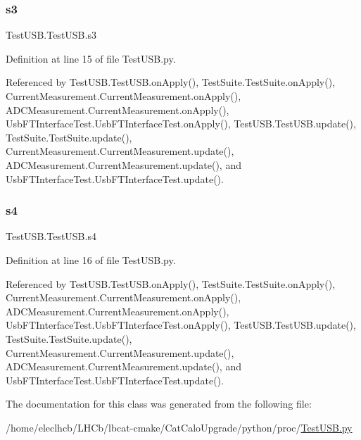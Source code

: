 \mbox{\label{classTestUSB_1_1TestUSB_a2983f5d10e563e44de3beac6fc9cb165}} 
\subsubsection{\texorpdfstring{s3}{s3}}
{\footnotesize\ttfamily Test\+U\+S\+B.\+Test\+U\+S\+B.\+s3}



Definition at line 15 of file Test\+U\+S\+B.\+py.



Referenced by Test\+U\+S\+B.\+Test\+U\+S\+B.\+on\+Apply(), Test\+Suite.\+Test\+Suite.\+on\+Apply(), Current\+Measurement.\+Current\+Measurement.\+on\+Apply(), A\+D\+C\+Measurement.\+Current\+Measurement.\+on\+Apply(), Usb\+F\+T\+Interface\+Test.\+Usb\+F\+T\+Interface\+Test.\+on\+Apply(), Test\+U\+S\+B.\+Test\+U\+S\+B.\+update(), Test\+Suite.\+Test\+Suite.\+update(), Current\+Measurement.\+Current\+Measurement.\+update(), A\+D\+C\+Measurement.\+Current\+Measurement.\+update(), and Usb\+F\+T\+Interface\+Test.\+Usb\+F\+T\+Interface\+Test.\+update().

\mbox{\label{classTestUSB_1_1TestUSB_a0e240d453ee3a58d9d9438dae4aa42ba}} 
\subsubsection{\texorpdfstring{s4}{s4}}
{\footnotesize\ttfamily Test\+U\+S\+B.\+Test\+U\+S\+B.\+s4}



Definition at line 16 of file Test\+U\+S\+B.\+py.



Referenced by Test\+U\+S\+B.\+Test\+U\+S\+B.\+on\+Apply(), Test\+Suite.\+Test\+Suite.\+on\+Apply(), Current\+Measurement.\+Current\+Measurement.\+on\+Apply(), A\+D\+C\+Measurement.\+Current\+Measurement.\+on\+Apply(), Usb\+F\+T\+Interface\+Test.\+Usb\+F\+T\+Interface\+Test.\+on\+Apply(), Test\+U\+S\+B.\+Test\+U\+S\+B.\+update(), Test\+Suite.\+Test\+Suite.\+update(), Current\+Measurement.\+Current\+Measurement.\+update(), A\+D\+C\+Measurement.\+Current\+Measurement.\+update(), and Usb\+F\+T\+Interface\+Test.\+Usb\+F\+T\+Interface\+Test.\+update().



The documentation for this class was generated from the following file\+:\begin{DoxyCompactItemize}
\item 
/home/eleclhcb/\+L\+H\+Cb/lbcat-\/cmake/\+Cat\+Calo\+Upgrade/python/proc/\hyperlink{TestUSB_8py}{Test\+U\+S\+B.\+py}\end{DoxyCompactItemize}
